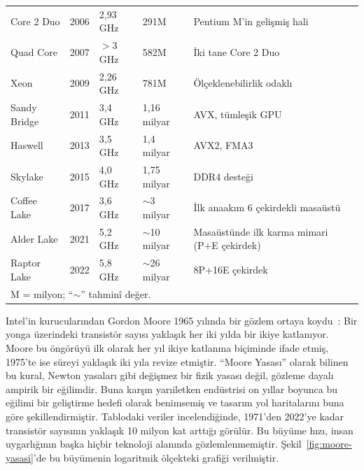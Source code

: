 \begin{table}[ht!]
\begin{tabular}{llllp{5cm}}
Core 2 Duo & 2006 & 2,93 GHz   & 291M    & Pentium M'in gelişmiş hali \\
Quad Core  & 2007 & $>$3 GHz   & 582M    & İki tane Core 2 Duo \\
Xeon       & 2009 & 2,26 GHz   & 781M    & Ölçeklenebilirlik odaklı \\
Sandy Bridge & 2011 & 3,4 GHz   & 1,16 milyar & AVX, tümleşik GPU \\
Haswell    & 2013 & 3,5 GHz    & 1,4 milyar  & AVX2, FMA3 \\
Skylake    & 2015 & 4,0 GHz    & 1,75 milyar & DDR4 desteği \\
Coffee Lake& 2017 & 3,6 GHz    & ${\sim}$3 milyar & İlk anaakım 6 çekirdekli masaüstü \\
Alder Lake & 2021 & 5,2 GHz    & ${\sim}$10 milyar & Masaüstünde ilk karma mimari (P+E çekirdek) \\
Raptor Lake& 2022 & 5,8 GHz    & ${\sim}$26 milyar & 8P+16E çekirdek \\
\bottomrule
\multicolumn{5}{l}{\scriptsize M = milyon; ``${\sim}$'' tahminî değer.}
\end{tabular}
\end{table}

Intel'in kurucularından Gordon Moore 1965 yılında bir gözlem ortaya koydu~\cite{moore1965}: Bir yonga üzerindeki transistör sayısı yaklaşık her iki yılda bir ikiye katlanıyor. Moore bu öngörüyü ilk olarak her yıl ikiye katlanma biçiminde ifade etmiş, 1975'te ise süreyi yaklaşık iki yıla revize etmiştir. ``Moore Yasası'' olarak bilinen bu kural, Newton yasaları gibi değişmez bir fizik yasası değil, gözleme dayalı ampirik bir eğilimdir. Buna karşın yarıiletken endüstrisi on yıllar boyunca bu eğilimi bir geliştirme hedefi olarak benimsemiş ve tasarım yol haritalarını buna göre şekillendirmiştir. Tablodaki veriler incelendiğinde, 1971'den 2022'ye kadar transistör sayısının yaklaşık 10 milyon kat arttığı görülür. Bu büyüme hızı, insan uygarlığının başka hiçbir teknoloji alanında gözlemlenmemiştir. Şekil~\ref{fig:moore-yasasi}'de bu büyümenin logaritmik ölçekteki grafiği verilmiştir.

